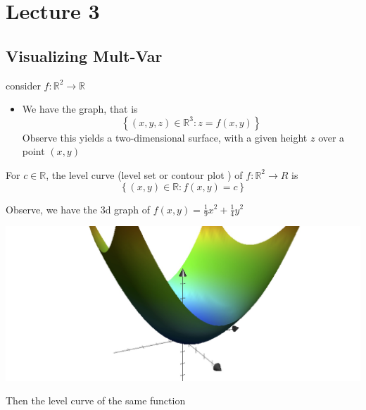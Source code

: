 \documentclass[11pt]{book}
\begin{document}



\chapter{Lecture 3}%
\label{chp:lecture_3}



\section{Visualizing Mult-Var}%
\label{sec:visualizing_mult_var}

consider $f : \mathbb{R} ^2  \to \mathbb{R}  $ 
\begin{itemize}
    \item We have the graph, that is 
        \[
            \left\{ \left( x,y, z \right) \in  \mathbb{R} ^{3} : z= f\left(x, y\right)  \right\}    
        \]
        Observe this yields a two-dimensional surface, with a given height $z$ over a point $\left( x,y \right) $ 
\end{itemize}

\begin{defn}\label{defn:level_curve}
    For $c \in  \mathbb{R} $,  the level curve (level set or contour plot ) of $f : \mathbb{R} ^2  \to R $ is 
    \[
        \left\{ \left( x, y \right) \in \mathbb{R} : f\left(x,y\right) = c \right\} 
    \]
\end{defn}

Observe, we have the 3d graph of $f\left(x, y\right) = \frac{1}{9}x^2  + \frac{1}{4}y^2 $  

\begin{center}
    \includegraphics[width=0.7\columnwidth]{assets/3d-graph.jpg}
\end{center}

Then the level curve of the same function 
\end{document}
